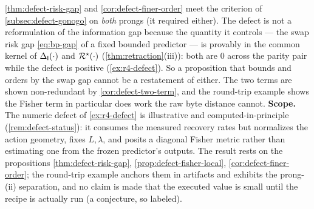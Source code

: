 \begin{remark}
\label{rem:defect-go-scope}
\cref{thm:defect-risk-gap} and \cref{cor:defect-finer-order} meet the criterion of
\cref{subsec:defect-gonogo} on \emph{both} prongs (it required either). The defect
is not a reformulation of the information gap because the quantity it controls ---
the swap risk gap \eqref{eq:bp-gap} of a fixed bounded predictor --- is provably
in the common kernel of $\Delta_{\mathsf{I}}\!\left(\cdot\right)$ and $\mathcal{R}^{\star}(\cdot)$
(\cref{thm:retraction}(iii)): both are $0$ across the parity pair while the defect
is positive (\cref{ex:r4-defect}). So a proposition that bounds and orders by the
swap gap cannot be a restatement of either. The two terms are shown
non-redundant by \cref{cor:defect-two-term}, and the round-trip example shows the
Fisher term in particular does work the raw byte distance cannot. \textbf{Scope.}
The numeric defect of \cref{ex:r4-defect} is illustrative and computed-in-principle
(\cref{rem:defect-status}): it consumes the measured recovery rates but normalizes the
action geometry, fixes $L,\lambda$, and posits a diagonal Fisher metric rather
than estimating one from the frozen predictor's outputs. The result rests on the
propositions \cref{thm:defect-risk-gap}, \cref{prop:defect-fisher-local},
\cref{cor:defect-finer-order}; the round-trip example anchors them in artifacts and
exhibits the prong-(ii) separation, and no claim is made that the executed value
is small until the recipe is actually run (a conjecture, so labeled).
\end{remark}
